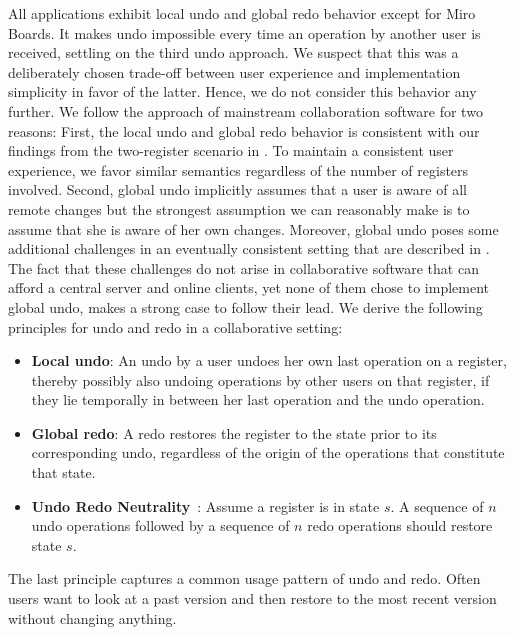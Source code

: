 \documentclass[sigplan,natbib=false,review]{acmart}
\begin{document}
All applications exhibit local undo and global redo behavior
except for Miro Boards.
It makes undo impossible every time an operation by another user is
received, settling on the third undo approach.
We suspect that this was a deliberately chosen trade-off between
user experience and implementation simplicity in favor of the latter.
Hence, we do not consider this behavior any further.
We follow the approach of mainstream collaboration software for two reasons:
First, the local undo and global redo behavior is consistent with our
findings from the two-register scenario in .
To maintain a consistent user experience, we favor similar semantics
regardless of the number of registers involved.
Second, global undo implicitly assumes that a user is aware of all remote changes
but the strongest assumption we can reasonably make is to assume that she is aware
of her own changes.
Moreover, global undo poses some additional challenges in an eventually
consistent setting that are described in .
The fact that these challenges do not arise in collaborative
software that can afford a central server and online clients,
yet none of them chose to implement global undo, makes a strong
case to follow their lead.
We derive the following principles for undo and redo in a collaborative
setting:

\begin{itemize}
  \item \textbf{Local undo}:
    An undo by a user undoes her own last operation on a register,
    thereby possibly also undoing operations by other users on that register,
    if they lie temporally in between her last operation and the undo operation.
  \item \textbf{Global redo}:
    A redo restores the register to the state prior to its corresponding undo,
    regardless of the origin of the operations that constitute that state.
  \item \textbf{Undo Redo Neutrality}~\cite{figma2019multiplayer}:
    Assume a register is in state $s$.
    A sequence of $n$ undo operations followed by a sequence of $n$ redo operations
    should restore state $s$.
\end{itemize}

The last principle captures a common usage pattern of undo and redo.
Often users want to look at a past version and then restore to the most
recent version without changing anything.

\end{document}
